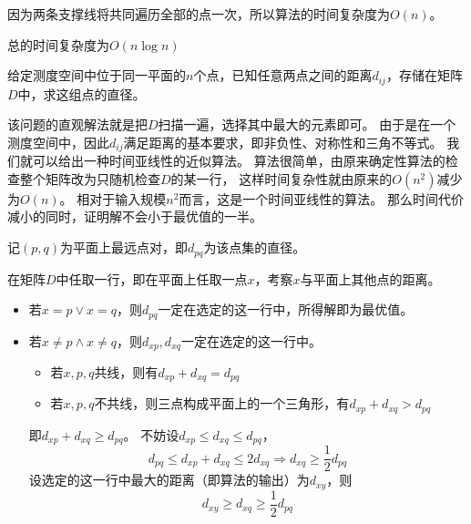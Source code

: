 \begin{questions}
\begin{solution}
        因为两条支撑线将共同遍历全部的点一次，所以算法的时间复杂度为$O(n)$。

        总的时间复杂度为$O(n \log n)$
    \end{solution}

    \question 给定测度空间中位于同一平面的$n$个点，已知任意两点之间的距离$d_{ij}$，存储在矩阵$D$中，求这组点的直径。

    该问题的直观解法就是把$D$扫描一遍，选择其中最大的元素即可。
    由于是在一个测度空间中，因此$d_{ij}$满足距离的基本要求，即非负性、对称性和三角不等式。
    我们就可以给出一种时间亚线性的近似算法。
    算法很简单，由原来确定性算法的检查整个矩阵改为只随机检查$D$的某一行，
    这样时间复杂性就由原来的$O(n^2)$减少为$O(n)$。
    相对于输入规模$n^2$而言，这是一个时间亚线性的算法。
    那么时间代价减小的同时，证明解不会小于最优值的一半。

    \begin{solution}

        \proof 记$(p,q)$为平面上最远点对，即$d_{pq}$为该点集的直径。

        在矩阵$D$中任取一行，即在平面上任取一点$x$，考察$x$与平面上其他点的距离。
        \begin{itemize}
            \item 若$x = p \vee x = q$，则$d_{pq}$一定在选定的这一行中，所得解即为最优值。
            \item 若$x \ne p \wedge x \ne q$，则$d_{xp}, d_{xq}$一定在选定的这一行中。
                  \begin{itemize}
                      \item 若$x,p,q$共线，则有$d_{xp} + d_{xq} = d_{pq}$
                      \item 若$x,p,q$不共线，则三点构成平面上的一个三角形，有$d_{xp} + d_{xq} > d_{pq}$
                  \end{itemize}
                  即$d_{xp} + d_{xq} \ge d_{pq}$。
                  不妨设$d_{xp} \le d_{xq} \le d_{pq}$，\[
                      d_{pq} \le d_{xp} + d_{xq} \le 2d_{xq} \Longrightarrow
                      d_{xq} \ge \frac{1}{2} d_{pq}
                  \]
                  设选定的这一行中最大的距离（即算法的输出）为$d_{xy}$，则\[
                      d_{xy} \ge d_{xq} \ge \frac{1}{2}  d_{pq}
                  \]
        \end{itemize}
    \end{solution}


\end{questions}
